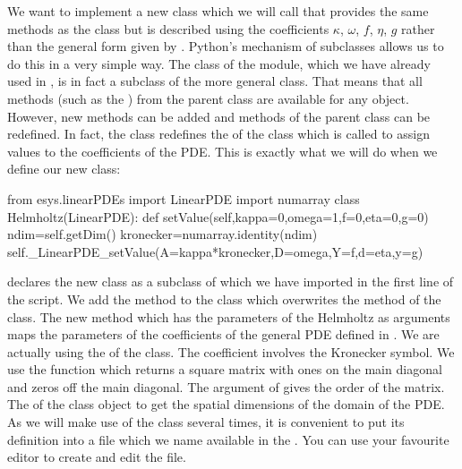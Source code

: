 We want to implement a 
new class which we will call  that provides the same methods as the \LinearPDE class but
is described using the coefficients $\kappa$, $\omega$, $f$, $\eta$, 
$g$ rather than the general form given by . 
Python's mechanism of subclasses allows us to do this in a very simple way.
The \Poisson class of the \linearPDEsPack module,
which we have already used in , is in fact a subclass of the more general
\LinearPDE class. That means that all methods (such as the )
from the parent class \LinearPDE are available for any \Poisson object. However, new
methods can be added and methods of the parent class can be redefined. In fact,
the \Poisson class redefines the  of the \LinearPDE class which is called to assign 
values to the coefficients of the PDE. This is exactly what we will do when we define 
our new  class:
\begin{python}
from esys.linearPDEs import LinearPDE
import numarray
class Helmholtz(LinearPDE):
   def setValue(self,kappa=0,omega=1,f=0,eta=0,g=0)
        ndim=self.getDim()
        kronecker=numarray.identity(ndim)
        self._LinearPDE_setValue(A=kappa*kronecker,D=omega,Y=f,d=eta,y=g)
\end{python}
 declares the new  class as a subclass 
of \LinearPDE which we have imported in the first line of the script. 
We add the method  to the class which overwrites the 
 method of the \LinearPDE class. The new method which has the 
parameters of the Helmholtz  as arguments 
maps the parameters of the coefficients of the general PDE defined 
in . We are actually using the  of 
the \LinearPDE class. 
The coefficient  involves the Kronecker symbol. We use the
\numarray function  which returns a square matrix with ones on the
main diagonal and zeros off the main diagonal. The argument of  gives the order of the matrix.
The  of the \LinearPDE class object  to get the spatial dimensions of the domain of the
PDE. As we will make use of the  class several times, it is convenient to 
put its definition into a file which we name  available in the \ExampleDirectory.
You can use your favourite editor to create and edit the file.   

